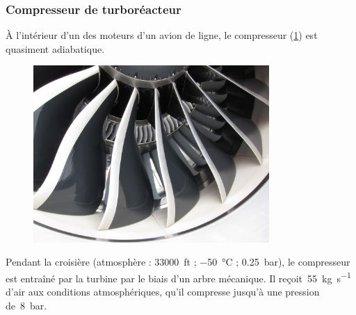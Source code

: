 \subsubsection{Compresseur de turboréacteur}
\label{exo_compresseur_turboreacteur}

	À l’intérieur d’un des moteurs d’un avion de ligne, le compresseur (\cref{fig_exo_entree_genx2b}) est quasiment adiabatique.	
	
	\begin{figure}[bh]
		\begin{center}
			\includegraphics[width=0.8\textwidth]{images/entree_genx2b.jpg}
		\end{center}
		\label{fig_exo_entree_genx2b}
	\end{figure}

	Pendant la croisière (atmosphère : \SI{33 000}{ft} ; \SI{-50}{\degreeCelsius} ; \SI{0,25}{\bar}), le compresseur est entraîné par la turbine par le biais d’un arbre mécanique. Il reçoit~\SI{55}{\kilogram\per\second} d’air aux conditions atmosphériques, qu’il compresse jusqu’à une pression de~\SI{8}{\bar}.
	
